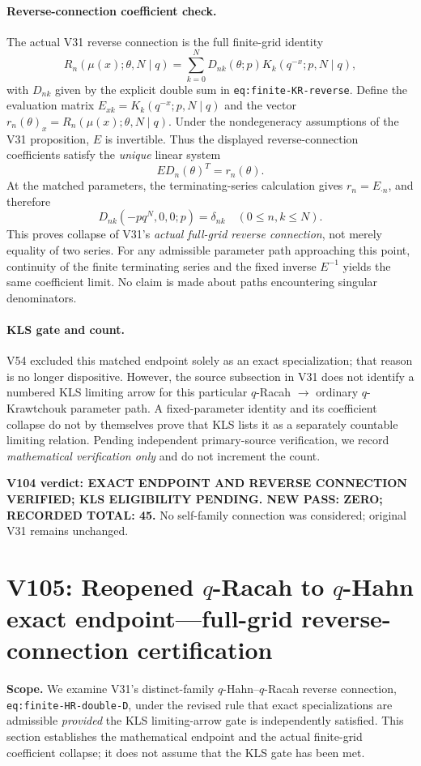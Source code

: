 \documentclass[11pt]{article}
\begin{document}
\paragraph{Reverse-connection coefficient check.} The actual V31 reverse connection is the full finite-grid identity
\[
 R_n(\mu(x);\theta,N\mid q)=\sum_{k=0}^N D_{nk}(\theta;p)K_k(q^{-x};p,N\mid q),
\]
with $D_{nk}$ given by the explicit double sum in \texttt{eq:finite-KR-reverse}. Define the evaluation matrix $E_{xk}=K_k(q^{-x};p,N\mid q)$ and the vector $r_n(\theta)_x=R_n(\mu(x);\theta,N\mid q)$. Under the nondegeneracy assumptions of the V31 proposition, $E$ is invertible. Thus the displayed reverse-connection coefficients satisfy the \emph{unique} linear system
\[
 E D_n(\theta)^T=r_n(\theta).
\]
At the matched parameters, the terminating-series calculation gives $r_n=E_{\cdot n}$, and therefore
\begin{equation}\label{eq:v104-r-k-collapse}
 \boxed{D_{nk}(-pq^N,0,0;p)=\delta_{nk}\quad(0\le n,k\le N).}
\end{equation}
This proves collapse of V31's \emph{actual full-grid reverse connection}, not merely equality of two series. For any admissible parameter path approaching this point, continuity of the finite terminating series and the fixed inverse $E^{-1}$ yields the same coefficient limit. No claim is made about paths encountering singular denominators.

\paragraph{KLS gate and count.} V54 excluded this matched endpoint solely as an exact specialization; that reason is no longer dispositive. However, the source subsection in V31 does not identify a numbered KLS limiting arrow for this particular $q$-Racah $\to$ ordinary $q$-Krawtchouk parameter path. A fixed-parameter identity and its coefficient collapse do not by themselves prove that KLS lists it as a separately countable limiting relation. Pending independent primary-source verification, we record \emph{mathematical verification only} and do not increment the count.

\noindent\textbf{V104 verdict: EXACT ENDPOINT AND REVERSE CONNECTION VERIFIED; KLS ELIGIBILITY PENDING. NEW PASS: ZERO; RECORDED TOTAL: 45.} No self-family connection was considered; original V31 remains unchanged.



\clearpage
\section{V105: Reopened $q$-Racah to $q$-Hahn exact endpoint---full-grid reverse-connection certification}
\noindent\textbf{Scope.} We examine V31's distinct-family $q$-Hahn--$q$-Racah reverse connection, \texttt{eq:finite-HR-double-D}, under the revised rule that exact specializations are admissible \emph{provided} the KLS limiting-arrow gate is independently satisfied. This section establishes the mathematical endpoint and the actual finite-grid coefficient collapse; it does not assume that the KLS gate has been met.
\end{document}
